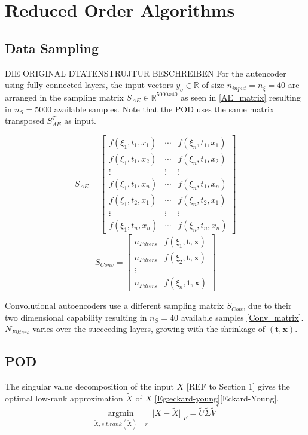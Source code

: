 \documentclass[12pt, a4paper]{article}
\begin{document}
\section{Reduced Order Algorithms}
\subsection{Data Sampling}
DIE ORIGINAL DTATENSTRUJTUR BESCHREIBEN
For the autencoder using fully connected layers, the input vectors $y_o \in \mathbb{R}$ of size $n_{input} = n_{\xi} = 40$ are arranged in the sampling matrix $S_{AE} \in \mathbb{R}^{5000x40}$ as seen in \cref{AE_matrix} resulting in $n_S = 5000$ available samples. Note that the POD uses the same matrix transposed $S_{AE}^T$ as input.
\begin{multicols}{2}
	\begin{equation}
	S_{AE} = \begin{bmatrix}
	f(\xi_1,t_1,x_1)&\cdots &f(\xi_n,t_1,x_1) \\
	f(\xi_1,t_1,x_2)&\cdots &f(\xi_n,t_1,x_2) \\
	\vdots& \vdots & \vdots\\
	f(\xi_1,t_1,x_n)&\cdots &f(\xi_n,t_1,x_n)\\
	f(\xi_1,t_2,x_1)&\cdots &f(\xi_n,t_2,x_1)\\
	\vdots & \vdots & \vdots\\
	f(\xi_1,t_n,x_n)&\cdots &f(\xi_n,t_n,x_n)
	\end{bmatrix}
	\label{AE_matrix}
	\end{equation}\break
	\begin{equation}
	S_{Conv}= \begin{bmatrix}
	n_{Filters}&f(\xi_1,\textbf{t},\textbf{x})\\
	n_{Filters}&f(\xi_2,\textbf{t},\textbf{x})\\
	\vdots\\
	n_{Filters}&f(\xi_n,\textbf{t},\textbf{x})
	\end{bmatrix}
	\label{Conv_matrix}
	\end{equation}
\end{multicols}\noindent
Convolutional autoencoders use a different sampling matrix $S_{Conv}$ due to their two dimensional capability resulting in $n_S = 40$ available samples \cref{Conv_matrix}.$N_{Filters}$ varies over the succeeding layers, growing with the shrinkage of $(\textbf{t},\textbf{x})$.
\subsection{POD}
The singular value decomposition of the input $X$ [REF to Section 1] gives the optimal low-rank approximation $\tilde{X}$ of $X$ \cref{Eg:eckard-young}[Eckard-Young]. 
\begin{equation}
\underset{\tilde{X}, s.t. rank(\tilde{X})=r}{\operatorname{argmin}} || X -\tilde{X} ||_F=\tilde{U}\tilde{\Sigma}\tilde{V}^*
\label{Eg:eckard-young}
\end{equation}
\end{document}
